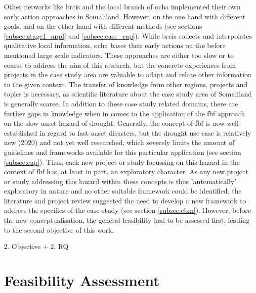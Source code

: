 Other networks like \acrlong{brcis} and the local branch of \acrshort{ocha} implemented their own early action approaches in Somaliland. However, on the one hand with different goals, and on the other hand with different methods (see sections \ref{subsec:stage1_appl} and \ref{subsec:case_eap}). While \acrshort{brcis} collects and interpolates qualitative local information, \acrshort{ocha} bases their early actions on the before mentioned large scale indicators. These approaches are either too slow or to coarse to address the aim of this research, but the concrete experiences from projects in the case study area are valuable to adapt and relate other information to the given context. The transfer of knowledge from other regions, projects and topics is necessary, as scientific literature about the case study area of Somaliland is generally scarce. In addition to these case study related domains, there are further gaps in knowledge when in comes to the application of the \acrshort{fbf} approach on the slow-onset hazard of drought. Generally, the concept of \acrshort{fbf} is now well established in regard to fast-onset disasters, but the drought use case is relatively new (2020) and not yet well researched, which severely limits the amount of guidelines and frameworks available for this particular application (see section \ref{subsec:eap}). Thus, each new project or study focussing on this hazard in the context of \acrshort{fbf} has, at least in part, an exploratory character.\newline
As any new project or study addressing this hazard within these concepts is thus 'automatically' exploratory in nature and no other suitable framework could be identified, the literature and project review suggested the need to develop a new framework to address the specifics of the case study (see section \ref{subsec:cbm}). However, before the new conceptualisation, the general feasibility had to be assessed first, leading to the second objective of this work.

2. Objective + 2. RQ
\section{Feasibility Assessment}

